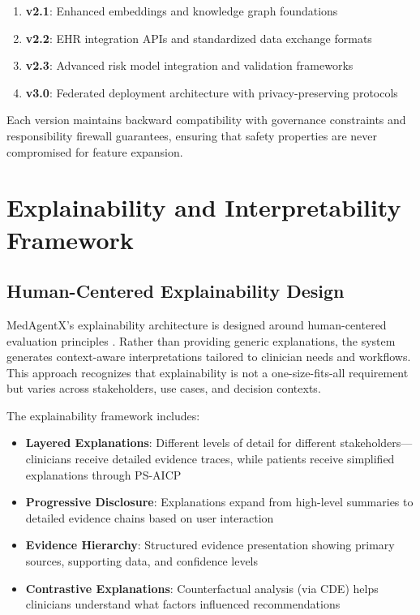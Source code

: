 \documentclass[journal]{IEEEtran}
\begin{document}
\begin{enumerate}
    \item \textbf{v2.1}: Enhanced embeddings and knowledge graph foundations
    \item \textbf{v2.2}: EHR integration APIs and standardized data exchange formats
    \item \textbf{v2.3}: Advanced risk model integration and validation frameworks
    \item \textbf{v3.0}: Federated deployment architecture with privacy-preserving protocols
\end{enumerate}

Each version maintains backward compatibility with governance constraints and responsibility firewall guarantees, ensuring that safety properties are never compromised for feature expansion.

\newpage
\section{Explainability and Interpretability Framework}

\subsection{Human-Centered Explainability Design}
MedAgentX's explainability architecture is designed around human-centered evaluation principles \cite{xai_human_centered_2025}. Rather than providing generic explanations, the system generates context-aware interpretations tailored to clinician needs and workflows. This approach recognizes that explainability is not a one-size-fits-all requirement but varies across stakeholders, use cases, and decision contexts.

The explainability framework includes:
\begin{itemize}
    \item \textbf{Layered Explanations}: Different levels of detail for different stakeholders—clinicians receive detailed evidence traces, while patients receive simplified explanations through PS-AICP
    \item \textbf{Progressive Disclosure}: Explanations expand from high-level summaries to detailed evidence chains based on user interaction
    \item \textbf{Evidence Hierarchy}: Structured evidence presentation showing primary sources, supporting data, and confidence levels
    \item \textbf{Contrastive Explanations}: Counterfactual analysis (via CDE) helps clinicians understand what factors influenced recommendations
\end{itemize}
\end{document}
